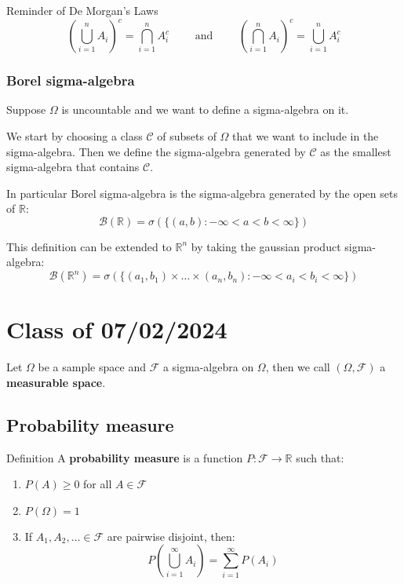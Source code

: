 \documentclass[10pt]{extarticle}
\newcommand{\R}{\mathbb{R}}
\newcommand{\F}{\mathcal{F}}
\begin{document}
\begin{notebox}{Reminder of De Morgan's Laws}
    $$
        \left(\bigcup_{i=1}^n A_i\right)^c = \bigcap_{i=1}^n A_i^c
        \qquad \text{ and } \qquad
        \left(\bigcap_{i=1}^n A_i\right)^c = \bigcup_{i=1}^n A_i^c
    $$
\end{notebox}

\subsubsection{Borel sigma-algebra}

Suppose $\Omega$ is uncountable and we want to define a sigma-algebra on it.

We start by choosing a class $\mathcal C$ of subsets of $\Omega$ that we want to include in the sigma-algebra.
Then we define the sigma-algebra generated by $\mathcal C$ as the smallest sigma-algebra that contains $\mathcal C$.

In particular Borel sigma-algebra is the sigma-algebra generated by the open sets of $\R$:
$$
    \mathcal B (\R) = \sigma(\{(a, b) : -\infty < a < b < \infty\})
$$

This definition can be extended to $\R^n$ by taking the gaussian product sigma-algebra:
$$
    \mathcal B (\R^n) = \sigma(\{(a_1, b_1) \times \dots \times (a_n, b_n) : -\infty < a_i < b_i < \infty\})
$$

\section{Class of 07/02/2024}

Let $\Omega$ be a sample space and $\F$ a sigma-algebra on $\Omega$,
then we call $(\Omega, \F)$ a \textbf{measurable space}.

\subsection{Probability measure}

\begin{bluebox}{Definition}
    A \textbf{probability measure} is a function $P: \F \to \R$ such that:
    \begin{enumerate}
        \item $P(A) \ge 0$ for all $A \in \F$
        \item $P(\Omega) = 1$
        \item If $A_1, A_2, \dots \in \F$ are pairwise disjoint, then:
              $$
                  P\left(\bigcup_{i=1}^\infty A_i\right) = \sum_{i=1}^\infty P(A_i)
              $$
    \end{enumerate}
\end{bluebox}
\end{document}
